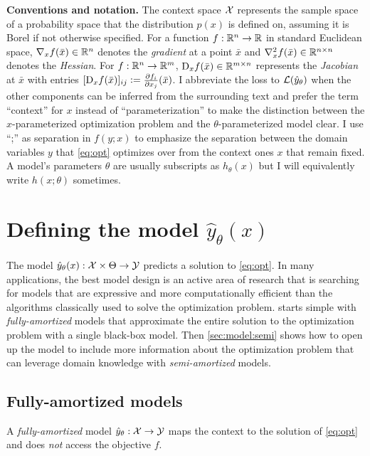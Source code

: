 \textbf{Conventions and notation.}
The context space ${\mathcal{X}}$ represents the
sample space of a probability space that
the distribution $p(x)$ is defined on,
assuming it is Borel if not otherwise specified.
For a function $f: \mathbb{R}^n\rightarrow\mathbb{R}$ in standard Euclidean space,
$\nabla_x f(\bar x)\in \mathbb{R}^n$ denotes the \emph{gradient} at a point $\bar x$
and $\nabla^2_x f(\bar x)\in\mathbb{R}^{n\times n}$ denotes the \emph{Hessian}.
For $f: \mathbb{R}^n\rightarrow\mathbb{R}^m$, $\mathrm{D}_x f(\bar x)\in\mathbb{R}^{m\times n}$
represents the \emph{Jacobian} at $\bar x$ with
entries $[\mathrm{D}_x f(\bar x)]_{ij}\vcentcolon= \frac{\partial f_i}{\partial x_j}(\bar x)$.
I abbreviate the loss to ${\mathcal{L}}(\hat y_\theta)$
when the other components can be inferred from the
surrounding text and prefer the term ``context'' for $x$ instead of
``parameterization'' to make the distinction between the
$x$-parameterized optimization problem
and the $\theta$-parameterized model clear.
I use ``;'' as separation in $f(y; x)$ to emphasize the separation
between the domain variables $y$ that \cref{eq:opt}
optimizes over from the context ones $x$ that remain fixed.
A model's parameters $\theta$ are usually subscripts
as $h_\theta(x)$ but I will equivalently write
$h(x; \theta)$ sometimes.

\section{Defining the model $\hat y_\theta(x)$}
\label{sec:model}
The model $\hat y_\theta(x): {\mathcal{X}}\times\Theta\rightarrow {\mathcal{Y}}$
predicts a solution to \cref{eq:opt}.
In many applications, the best model design is an active
area of research that is searching for models that are
expressive and more computationally efficient than the
algorithms classically used to solve the optimization problem.
 starts simple with \emph{fully-amortized} models
that approximate the entire solution
to the optimization problem with a single black-box model.
Then \cref{sec:model:semi} shows how to open up the model
to include more information about the optimization problem
that can leverage domain knowledge with \emph{semi-amortized} models.

\subsection{Fully-amortized models}
\label{sec:model:full}
\begin{definition}
  A \emph{fully-amortized} model $\hat y_\theta: {\mathcal{X}}\rightarrow{\mathcal{Y}}$
  maps the context to the solution of \cref{eq:opt}
  and does \emph{not} access the objective $f$.
\end{definition}

